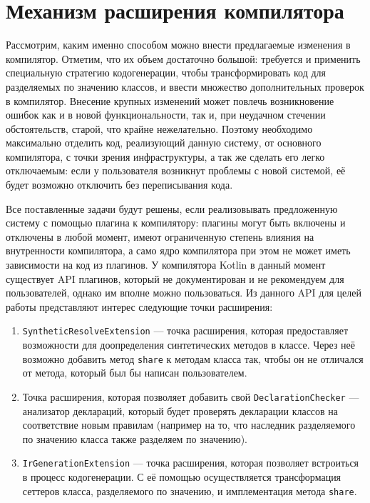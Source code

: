 \documentclass[specification,annotation,times]{itmo-student-thesis}
\begin{document}
\section{Механизм расширения компилятора}\label{codegen}

Рассмотрим, каким именно способом можно внести предлагаемые изменения в компилятор. Отметим, что их объем достаточно большой: требуется и применить специальную стратегию кодогенерации, чтобы трансформировать код для разделяемых по значению классов, и ввести множество дополнительных проверок в компилятор.
Внесение крупных изменений может повлечь возникновение ошибок как и в новой функциональности, так и, при неудачном стечении обстоятельств, старой, что крайне нежелательно.
Поэтому необходимо максимально отделить код, реализующий данную систему, от основного компилятора, с точки зрения инфраструктуры, а так же сделать его легко отключаемым: если у пользователя возникнут проблемы с новой системой, её будет возможно отключить без переписывания кода.

Все поставленные задачи будут решены, если реализовывать предложенную систему с помощью плагина к компилятору: плагины могут быть включены и отключены в любой момент, имеют ограниченную степень влияния на внутренности компилятора, а само ядро компилятора при этом не может иметь зависимости на код из плагинов.
У компилятора Kotlin в данный момент существует API плагинов, который не документирован и не рекомендуем для пользователей, однако им вполне можно пользоваться. Из данного API для целей работы представляют интерес следующие точки расширения:

\begin{enumerate}
	\item \texttt{SyntheticResolveExtension} --- точка расширения, которая предоставляет возможности для доопределения синтетических методов в классе. Через неё возможно добавить метод \texttt{share} к методам класса так, чтобы он не отличался от метода, который был бы написан пользователем.
	\item Точка расширения, которая позволяет добавить свой \texttt{DeclarationChecker} --- анализатор деклараций, который будет проверять декларации классов на соответствие новым правилам (например на то, что наследник разделяемого по значению класса также разделяем по значению).
	\item \texttt{IrGenerationExtension} --- точка расширения, которая позволяет встроиться в процесс кодогенерации. С её помощью осуществляется трансформация сеттеров класса, разделяемого по значению, и имплементация метода \texttt{share}.
\end{enumerate}
\end{document}
